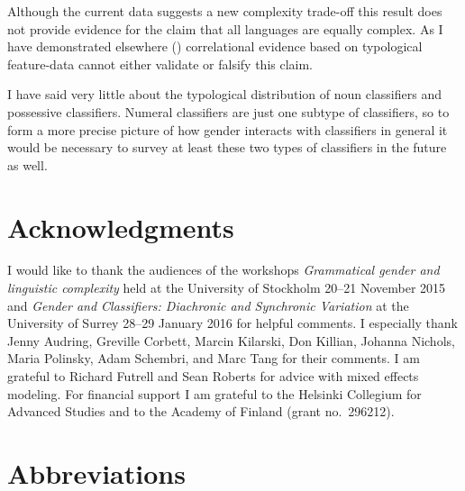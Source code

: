 \documentclass[output=collectionpaper]{langsci/langscibook}
\begin{document}
Although the current data suggests a new complexity trade-off this result does not provide evidence for the claim that all languages are equally complex. As I have demonstrated elsewhere (\citealt{Sinnemaeki2014a}) correlational evidence based on typological feature-data cannot either validate or falsify this claim.

I have said very little about the typological distribution of noun classifiers and possessive classifiers. Numeral classifiers are just one subtype of classifiers, so to form a more precise picture of how gender interacts with classifiers in general it would be necessary to survey at least these two types of classifiers in the future as well.

\section*{Acknowledgments}

I would like to thank the audiences of the workshops \textit{Grammatical gender and linguistic complexity} held at the University of Stockholm 20--21 November 2015 and \textit{Gender and Classifiers: Diachronic and Synchronic Variation} at the University of Surrey 28--29 January 2016 for helpful comments. I especially thank Jenny Audring, Greville Corbett, Marcin Kilarski, Don Killian, Johanna Nichols, Maria Polinsky, Adam Schembri, and Marc Tang for their comments. I am grateful to Richard Futrell and Sean Roberts for advice with mixed effects modeling. For financial support I am grateful to the Helsinki Collegium for Advanced Studies and to the Academy of Finland (grant no.~296212).

\section*{Abbreviations}
\end{document}
